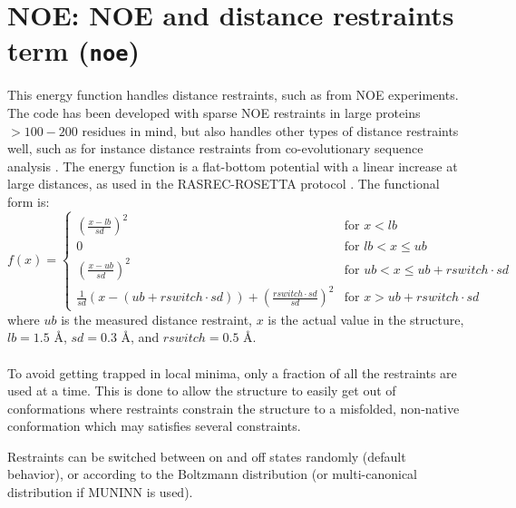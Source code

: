 \section{NOE: NOE and distance restraints term (\texttt{noe})}
\label{sec:noe}

This energy function handles distance restraints, such as from NOE experiments.
The code has been developed with sparse NOE restraints in large proteins $> 100-200$ residues in mind, but also handles other types of distance restraints well, such as for instance distance restraints from co-evolutionary sequence analysis \cite{10.7287/peerj.preprints.374v1}.
The energy function is a flat-bottom potential with a linear increase at large distances, as used in the RASREC-ROSETTA protocol \cite{LangePNAS2012}. The functional form is:
\begin{equation}
   f(x) =
\begin{cases}
\left( \frac{x-lb}{sd} \right)^2        & \text{for } x < lb \\
0                                       & \text{for } lb < x \leq ub \\
\left( \frac{x-ub}{sd} \right)^2        & \text{for } ub < x \leq ub + rswitch \cdot sd \\
\frac{1}{sd}\left(x - \left( ub + rswitch \cdot sd \right) \right) 
+ \left( \frac{rswitch \cdot sd }{sd} \right)^2
                                        & \text{for } x > ub + rswitch \cdot sd
\end{cases}
\end{equation}
where $ub$ is the measured distance restraint, $x$ is the actual value in the structure, 
$lb = 1.5$ \AA, $sd = 0.3$ \AA, and $rswitch = 0.5$ \AA.
\\\\To avoid getting trapped in local minima, only a fraction of all the restraints are used at a time.
This is done to allow the structure to easily get out of conformations where restraints constrain the structure to a misfolded, non-native conformation which may satisfies several constraints.

Restraints can be switched between on and off states randomly (default behavior), or according to the Boltzmann distribution (or multi-canonical distribution if MUNINN is used).

